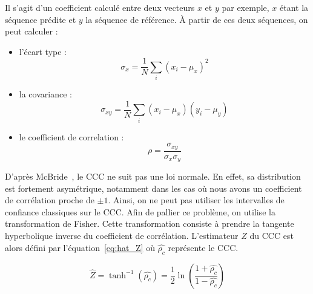 Il s'agit d'un coefficient calculé entre deux vecteurs $x$ et $y$ par exemple, $x$ étant la séquence prédite et $y$ la séquence de référence.
À partir de ces deux séquences, on peut calculer :

\begin{itemize}
  \item l'écart type :
  \begin{equation}
      \sigma_x = \dfrac{1}{N} \sum_{i} \left(x_i - \mu_x\right)^2
  \end{equation}

  \item la covariance :
  \begin{equation}
    \sigma_{xy} = \dfrac{1}{N} \sum_{i} \left(x_i - \mu_x\right)\left(y_i - \mu_y\right)
  \end{equation}

  \item le coefficient de correlation :
  \begin{equation}
    \rho = \dfrac{\sigma_{xy}}{\sigma_{x} \sigma_{y} }
  \end{equation}
\end{itemize}

D'après McBride~\cite{McBride2005}, le CCC ne suit pas une loi normale. En effet, sa distribution est fortement asymétrique, notamment dans les cas où nous avons un coefficient de corrélation proche de $\pm 1$.
Ainsi, on ne peut pas utiliser les intervalles de confiance classiques sur le CCC.
Afin de pallier ce problème, on utilise la transformation de Fisher.
Cette transformation consiste à prendre la tangente hyperbolique inverse du coefficient de corrélation.
L'estimateur $\hat{Z}$ du CCC est alors défini par l'équation~\ref{eq:hat_Z} où $\hat{\rho_c}$ représente le CCC.



\begin{equation}
  \hat{Z} = \tanh^{-1}(\hat{\rho_c}) =  \dfrac{1}{2} \ln \left( \dfrac{1+ \hat{\rho_c} }{1 -\hat{\rho_c}}  \right)
  \label{eq:hat_Z}
\end{equation}

